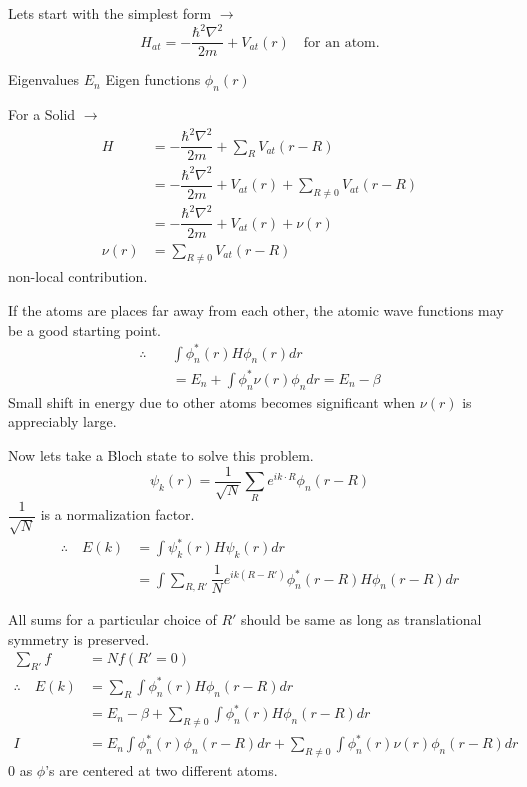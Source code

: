Lets start with the simplest form $\to$
$$
H_{at}=-\dfrac{\hbar^{2}\nabla^{2}}{2m}+V_{at}(r)\quad\text{for an atom.}
$$

Eigenvalues $E_{n}$ Eigen functions $\phi_{n}(r)$

For a Solid $\to$
\begin{align*}
H &= -\dfrac{\hbar^{2}\nabla^{2}}{2m}+\sum\limits_{R}V_{at}(r-R)\\[4pt]
  &= -\dfrac{\hbar^{2}\nabla^{2}}{2m}+V_{at}(r)+\sum\limits_{R\neq 0}V_{at}(r-R)\\[4pt]
  &= -\dfrac{\hbar^{2}\nabla^{2}}{2m}+V_{at}(r)+\nu(r)\\[4pt]
\nu(r)&=\sum\limits_{R\neq 0}V_{at}(r-R)
\end{align*}
non-local contribution.

If the atoms are places far away from each other, the atomic wave functions may be a good starting point.
\begin{align*}
\therefore\quad & \int \phi^{*}_{n}(r)H\phi_{n}(r)dr\\[4pt]
& =E_{n}+\int\phi^{*}_{n}\nu(r)\phi_{n}dr=E_{n}-\beta
\end{align*}
Small shift in energy due to other atoms becomes significant when $\nu(r)$ is appreciably large.

Now lets take a Bloch state to solve this problem.
$$
\psi_{k}(r)=\dfrac{1}{\sqrt{N}}\sum\limits_{R}e^{ik\cdot R}\phi_{n}(r-R)
$$
$\dfrac{1}{\sqrt{N}}$ is a normalization factor.
\begin{align*}
\therefore\quad E(k) &= \int \psi^{*}_{k}(r)H\psi_{k}(r)dr\\[4pt]
&= \int \sum\limits_{R,R'}\dfrac{1}{N}e^{ik(R-R')}\phi^{*}_{n}(r-R)H\phi_{n}(r-R)dr
\end{align*}

\newpage

All sums for a particular choice of $R'$ should be same as long as translational symmetry is preserved.
\begin{align*}
\sum\limits_{R'}f &= Nf(R'=0)\\[4pt]
\therefore\quad E(k) &= \sum\limits_{R}\int \phi^{*}_{n}(r)H\phi_{n}(r-R)dr\\[4pt]
&= E_{n}-\beta+\sum\limits_{R\neq 0}\int \phi^{*}_{n}(r)H\phi_{n}(r-R) dr\\[4pt]
I &= E_{n}\int\phi^{*}_{n}(r)\phi_{n}(r-R)dr+\sum\limits_{R\neq 0}\int \phi^{*}_{n}(r)\nu(r)\phi_{n}(r-R)dr
\end{align*}
$0$ as $\phi$'s are centered at two different atoms.

